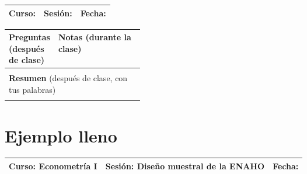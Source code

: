\documentclass{academic-report}
\begin{document}
\encabezado

\noindent
\begin{tabularx}{\linewidth}{|X|X|X|}
\hline
\textbf{Curso:} & \textbf{Sesión:} & \textbf{Fecha:} \\[0.5em]
\hline
\end{tabularx}

\vspace{0.6em}\noindent
\begin{tabularx}{\linewidth}{|p{0.27\linewidth}|X|}
\hline
\textbf{Preguntas} {\small(después de clase)} & \textbf{Notas} {\small(durante la clase)} \\
\hline
\rule{0pt}{12.6cm} & \\
\hline
\multicolumn{2}{|l|}{\textbf{Resumen} {\small(después de clase, con tus palabras)}} \\
\multicolumn{2}{|l|}{\rule{0pt}{3.4cm}} \\
\hline
\end{tabularx}

\newpage
\section*{Ejemplo lleno}
\noindent
\begin{tabularx}{\linewidth}{|X|X|X|}
\hline
\textbf{Curso:} Econometría I & \textbf{Sesión:} Diseño muestral de la ENAHO & \textbf{Fecha:} \\
\hline
\end{tabularx}
\end{document}
